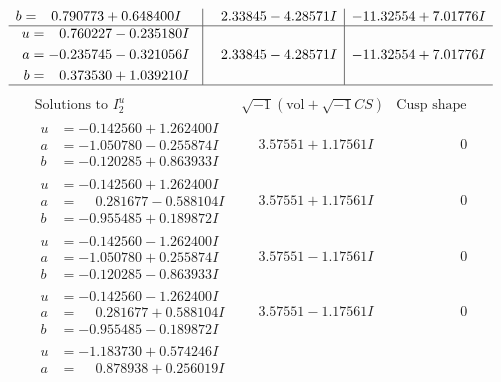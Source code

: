 \documentclass[1p]{elsarticle_modified}
\theoremstyle{definition}
\newcommand{\I}{\sqrt{-1}}
\begin{document}
$$\begin{array}{c|c|c}
\begin{aligned}
b &= \phantom{-}0.790773 + 0.648400 I\end{aligned}
 & \phantom{-}2.33845 - 4.28571 I & -11.32554 + 7.01776 I \\ \hline\begin{aligned}
u &= \phantom{-}0.760227 - 0.235180 I \\
a &= -0.235745 - 0.321056 I \\
b &= \phantom{-}0.373530 + 1.039210 I\end{aligned}
 & \phantom{-}2.33845 - 4.28571 I & -11.32554 + 7.01776 I\\
 \hline 
 \end{array}$$\newpage$$\begin{array}{c|c|c}  
\text{Solutions to }I^u_{2}& \I (\text{vol} + \sqrt{-1}CS) & \text{Cusp shape}\\
 \hline 
\begin{aligned}
u &= -0.142560 + 1.262400 I \\
a &= -1.050780 - 0.255874 I \\
b &= -0.120285 + 0.863933 I\end{aligned}
 & \phantom{-}3.57551 + 1.17561 I & \phantom{-0.000000 } 0 \\ \hline\begin{aligned}
u &= -0.142560 + 1.262400 I \\
a &= \phantom{-}0.281677 - 0.588104 I \\
b &= -0.955485 + 0.189872 I\end{aligned}
 & \phantom{-}3.57551 + 1.17561 I & \phantom{-0.000000 } 0 \\ \hline\begin{aligned}
u &= -0.142560 - 1.262400 I \\
a &= -1.050780 + 0.255874 I \\
b &= -0.120285 - 0.863933 I\end{aligned}
 & \phantom{-}3.57551 - 1.17561 I & \phantom{-0.000000 } 0 \\ \hline\begin{aligned}
u &= -0.142560 - 1.262400 I \\
a &= \phantom{-}0.281677 + 0.588104 I \\
b &= -0.955485 - 0.189872 I\end{aligned}
 & \phantom{-}3.57551 - 1.17561 I & \phantom{-0.000000 } 0 \\ \hline\begin{aligned}
u &= -1.183730 + 0.574246 I \\
a &= \phantom{-}0.878938 + 0.256019 I \\

\end{aligned}
\end{array}$$
\end{document}
